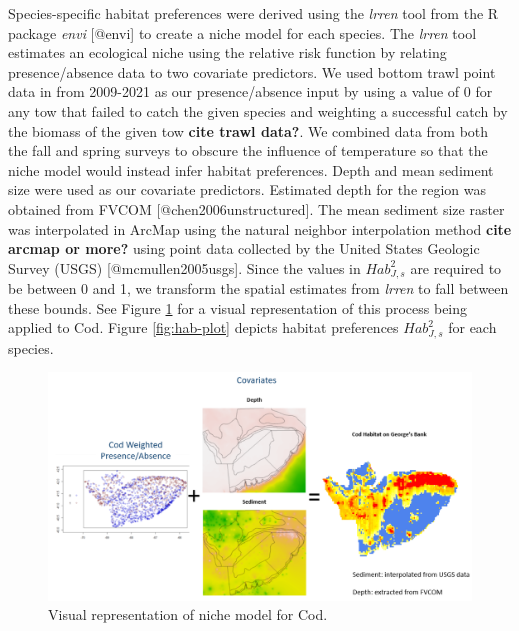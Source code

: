 \documentclass[
]{article}
\begin{document}
Species-specific habitat preferences were derived using the \emph{lrren} tool from the R package \emph{envi} {[}@envi{]} to create a niche model for each species. The \emph{lrren} tool estimates an ecological niche using the relative risk function by relating presence/absence data to two covariate predictors. We used bottom trawl point data in from 2009-2021 as our presence/absence input by using a value of 0 for any tow that failed to catch the given species and weighting a successful catch by the biomass of the given tow \textbf{cite trawl data?}. We combined data from both the fall and spring surveys to obscure the influence of temperature so that the niche model would instead infer habitat preferences. Depth and mean sediment size were used as our covariate predictors. Estimated depth for the region was obtained from FVCOM {[}@chen2006unstructured{]}. The mean sediment size raster was interpolated in ArcMap using the natural neighbor interpolation method \textbf{cite arcmap or more?} using point data collected by the United States Geologic Survey (USGS) {[}@mcmullen2005usgs{]}. Since the values in \(Hab^2_{J,s}\) are required to be between 0 and 1, we transform the spatial estimates from \emph{lrren} to fall between these bounds. See Figure \ref{fig:hab-plot1} for a visual representation of this process being applied to Cod. Figure \ref{fig:hab-plot} depicts habitat preferences \(Hab^2_{J,s}\) for each species.

\begin{figure}

{\centering \includegraphics[width=0.95\linewidth]{Images/hab_snip} 

}

\caption{Visual representation of niche model for Cod.}\label{fig:hab-plot1}
\end{figure}
\end{document}

